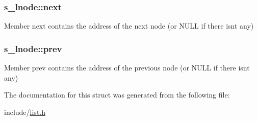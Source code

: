 \subsubsection[{next}]{\setlength{\rightskip}{0pt plus 5cm}s\+\_\+lnode\+::next}\label{structs__lnode_add1117deef5047ce064a52f68e2d611d}
Member \textquotesingle{}next\textquotesingle{} contains the address of the next node (or N\+U\+L\+L if there isn\textquotesingle{}t any) \hypertarget{structs__lnode_afe1761de9a211149f32219f03492d098}{}
\subsubsection[{prev}]{\setlength{\rightskip}{0pt plus 5cm}s\+\_\+lnode\+::prev}\label{structs__lnode_afe1761de9a211149f32219f03492d098}
Member \textquotesingle{}prev\textquotesingle{} contains the address of the previous node (or N\+U\+L\+L if there isn\textquotesingle{}t any) 

The documentation for this struct was generated from the following file\+:\begin{DoxyCompactItemize}
\item 
include/\hyperlink{list_8h}{list.\+h}\end{DoxyCompactItemize}
